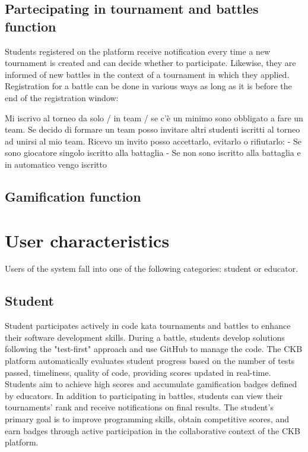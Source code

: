 \subsection{Partecipating in tournament and battles function}
Students registered on the platform receive notification every time a new tournament is created and can decide whether to participate.
Likewise, they are informed of new battles in the context of a tournament in which they applied.
Registration for a battle can be done in various ways as long as it is before the end of the registration window:

{\color{orange}
Mi iscrivo al torneo da solo / in team / se c'è un minimo sono obbligato a fare un team.
Se decido di formare un team posso invitare altri studenti iscritti al torneo ad unirsi al mio team.
Ricevo un invito posso accettarlo, evitarlo o rifiutarlo:
    - Se sono giocatore singolo iscritto alla battaglia
    - Se non sono iscritto alla battaglia e in automatico vengo iscritto

\subsection{Gamification function}
}

\section{User characteristics}
Users of the system fall into one of the following categories: student or educator.

\subsection*{Student}
Student participates actively in code kata tournaments and battles to enhance their software development skills. 
During a battle, students develop solutions following the "test-first" approach and use GitHub to manage the code. 
The CKB platform automatically evaluates student progress based on the number of tests passed, timeliness, quality of code, providing scores updated in real-time. 
Students aim to achieve high scores and accumulate gamification badges defined by educators. 
In addition to participating in battles, students can view their tournaments' rank and receive notifications on final results. 
The student's primary goal is to improve programming skills, obtain competitive scores, and earn badges through active participation in the collaborative context of the CKB platform.

